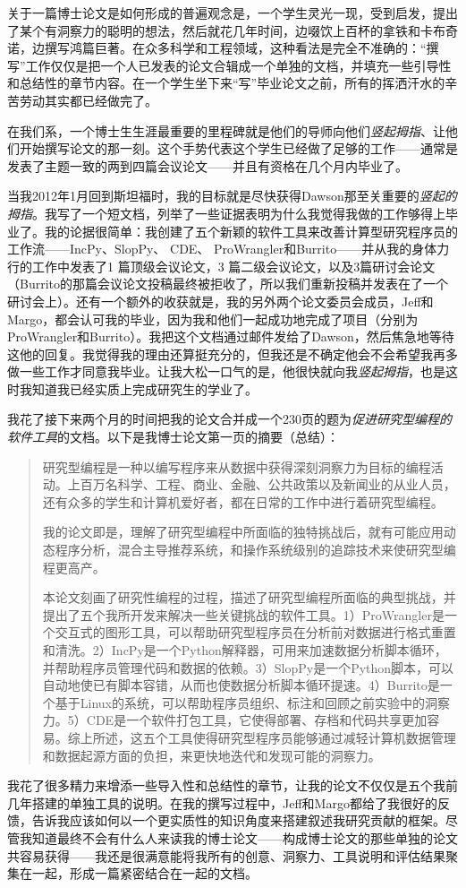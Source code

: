 \documentclass[letter,12pt]{book}
\begin{document}
\begin{CJK}{UTF8}{gbsn}
\breakline

关于一篇博士论文是如何形成的普遍观念是，一个学生灵光一现，受到启发，提出了某个有洞察力的聪明的想法，然后就花几年时间，边啜饮上百杯的拿铁和卡布奇诺，边撰写鸿篇巨著。在众多科学和工程领域，这种看法是完全不准确的：“撰写”工作仅仅是把一个人已发表的论文合辑成一个单独的文档，并填充一些引导性和总结性的章节内容。在一个学生坐下来“写”毕业论文之前，所有的挥洒汗水的辛苦劳动其实都已经做完了。

在我们系，一个博士生生涯最重要的里程碑就是他们的导师向他们\emph{竖起拇指}、让他们开始撰写论文的那一刻。这个手势代表这个学生已经做了足够的工作——通常是发表了主题一致的两到四篇会议论文——并且有资格在几个月内毕业了。

当我2012年1月回到斯坦福时，我的目标就是尽快获得Dawson那至关重要的\emph{竖起的拇指}。我写了一个短文档，列举了一些证据表明为什么我觉得我做的工作够得上毕业了。我的论据很简单：我创建了五个新颖的软件工具来改善计算型研究程序员的工作流——IncPy、SlopPy、 CDE、 ProWrangler和Burrito——并从我的身体力行的工作中发表了1 篇顶级会议论文，3 篇二级会议论文，以及3篇研讨会论文（Burrito的那篇会议论文投稿最终被拒收了，所以我们重新投稿并发表在了一个研讨会上）。还有一个额外的收获就是，我的另外两个论文委员会成员，Jeff和Margo，都会认可我的毕业，因为我和他们一起成功地完成了项目（分别为ProWrangler和Burrito）。我把这个文档通过邮件发给了Dawson，然后焦急地等待这他的回复。我觉得我的理由还算挺充分的，但我还是不确定他会不会希望我再多做一些工作才同意我毕业。让我大松一口气的是，他很快就向我\emph{竖起拇指}，也是这时我知道我已经实质上完成研究生的学业了。

我花了接下来两个月的时间把我的论文合并成一个230页的题为\emph{促进研究型编程的软件工具}的文档。以下是我博士论文第一页的摘要（总结）：
\begin{quote}
  研究型编程是一种以编写程序来从数据中获得深刻洞察力为目标的编程活动。上百万名科学、工程、商业、金融、公共政策以及新闻业的从业人员，还有众多的学生和计算机爱好者，都在日常的工作中进行着研究型编程。

  我的论文即是，理解了研究型编程中所面临的独特挑战后，就有可能应用动态程序分析，混合主导推荐系统，和操作系统级别的追踪技术来使研究型编程更高产。

  本论文刻画了研究性编程的过程，描述了研究型编程所面临的典型挑战，并提出了五个我所开发来解决一些关键挑战的软件工具。1）ProWrangler是一个交互式的图形工具，可以帮助研究型程序员在分析前对数据进行格式重置和清洗。2）IncPy是一个Python解释器，可用来加速数据分析脚本循环，并帮助程序员管理代码和数据的依赖。3）SlopPy是一个Python脚本，可以自动地使已有脚本容错，从而也使数据分析脚本循环提速。4）Burrito是一个基于Linux的系统，可以帮助程序员组织、标注和回顾之前实验中的洞察力。5）CDE是一个软件打包工具，它使得部署、存档和代码共享更加容易。综上所述，这五个工具使得研究型程序员能够通过减轻计算机数据管理和数据起源方面的负担，来更快地迭代和发现可能的洞察力。
\end{quote}
我花了很多精力来增添一些导入性和总结性的章节，让我的论文不仅仅是五个我前几年搭建的单独工具的说明。在我的撰写过程中，Jeff和Margo都给了我很好的反馈，告诉我应该如何以一个更实质性的知识角度来搭建叙述我研究贡献的框架。尽管我知道最终不会有什么人来读我的博士论文——构成博士论文的那些单独的论文共容易获得——我还是很满意能将我所有的创意、洞察力、工具说明和评估结果聚集在一起，形成一篇紧密结合在一起的文档。


\end{CJK}
\end{document}
